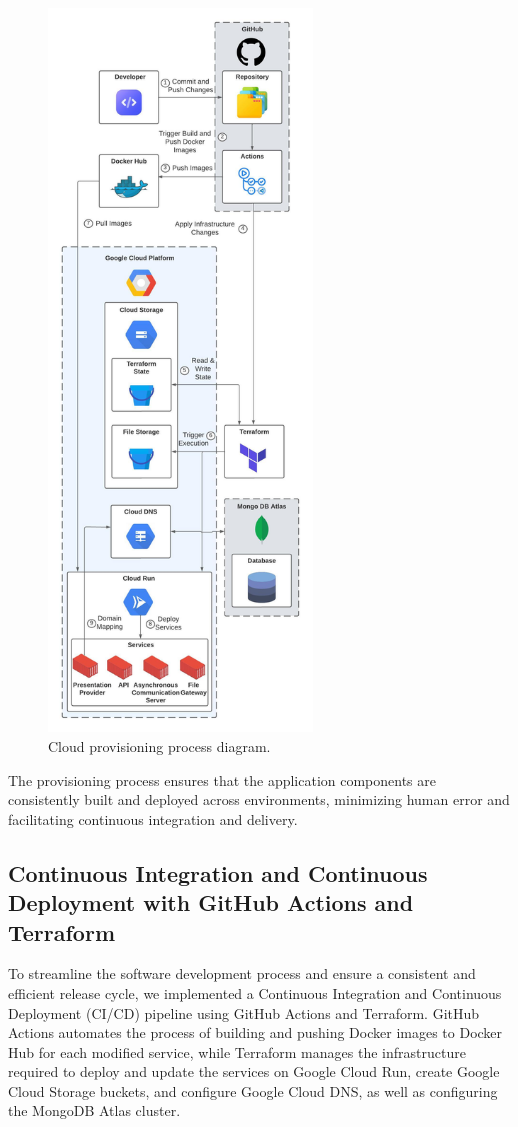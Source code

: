 \documentclass[a4paper,fleqn]{cas-dc}
\begin{document}
\begin{figure}[h]
\centering
\includegraphics[width=7cm]{CloudProvisioning.jpeg}
\caption{Cloud provisioning process diagram.}
\label{fig:provisioning}
\end{figure}

The provisioning process ensures that the application components are consistently built and deployed across environments, minimizing human error and facilitating continuous integration and delivery.

\subsection{Continuous Integration and Continuous Deployment with GitHub Actions and Terraform}

To streamline the software development process and ensure a consistent and efficient release cycle, we implemented a Continuous Integration and Continuous Deployment (CI/CD) pipeline using GitHub Actions and Terraform. GitHub Actions automates the process of building and pushing Docker images to Docker Hub for each modified service, while Terraform manages the infrastructure required to deploy and update the services on Google Cloud Run, create Google Cloud Storage buckets, and configure Google Cloud DNS, as well as configuring the MongoDB Atlas cluster.
\end{document}
